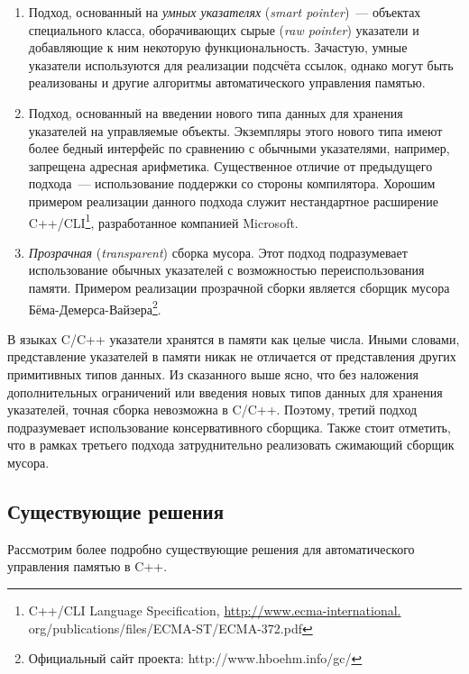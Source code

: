 \begin{enumerate}
\item 
	Подход, основанный на \emph{умных указателях} (\emph{smart pointer})~--- 
	объектах специального класса, оборачивающих сырые (\emph{raw pointer}) указатели и добавляющие 
	к ним некоторую функциональность. 
	Зачастую, умные указатели используются для реализации подсчёта ссылок, 
	однако могут быть реализованы и другие алгоритмы автоматического управления памятью.
\item 
	Подход, основанный на введении нового типа данных для хранения указателей на 
	управляемые объекты. 
	Экземпляры этого нового типа имеют более бедный интерфейс по сравнению с обычными 
	указателями, например, запрещена адресная арифметика. Существенное отличие от 
	предыдущего подхода~--- использование поддержки со стороны компилятора. 
	Хорошим примером реализации данного подхода служит нестандартное расширение 
	C++/CLI\footnote{C++/CLI Language Specification,
	\url{http://www.ecma-international.}\\{org/publications/files/ECMA-ST/ECMA-372.pdf}}, разработанное компанией Microsoft.
\item 
	\emph{Прозрачная} (\emph{transparent}) сборка мусора. Этот подход подразумевает 
	использование обычных указателей с возможностью переиспользования памяти. 
	Примером реализации прозрачной сборки является сборщик мусора 
	Бёма-Демерса-Вайзера\footnote{Официальный сайт проекта: http://www.hboehm.info/gc/}.
\end{enumerate}

В языках C/C++ указатели хранятся в памяти как целые числа. 
Иными словами, представление указателей в памяти никак не отличается от представления 
других примитивных типов данных. 
Из сказанного выше ясно, что без наложения дополнительных ограничений или введения новых 
типов данных для хранения указателей, точная сборка невозможна в C/C++. 
Поэтому, третий подход подразумевает использование консервативного сборщика. 
Также стоит отметить, что в рамках третьего подхода затруднительно реализовать 
сжимающий сборщик мусора.


\subsection{Существующие решения}
\label{sec:cpp_solutions}

Рассмотрим более подробно существующие решения для автоматического управления памятью в C++. 

